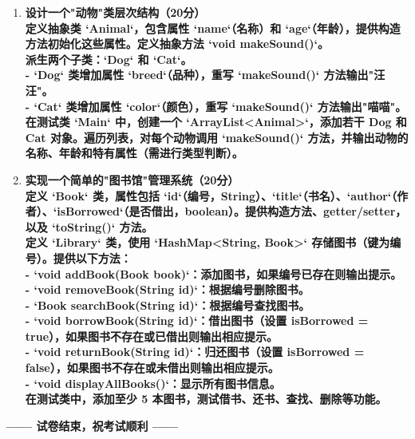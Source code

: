 \documentclass[a3paper, landscape, 11pt, twocolumn]{article}
\begin{document}
\begin{enumerate}[label=\arabic*.]

	\item \textbf{设计一个"动物"类层次结构（20分）\\
	      定义抽象类 `Animal`，包含属性 `name`（名称）和 `age`（年龄），提供构造方法初始化这些属性。定义抽象方法 `void makeSound()`。\\
	      派生两个子类：`Dog` 和 `Cat`。\\
	      - `Dog` 类增加属性 `breed`（品种），重写 `makeSound()` 方法输出"汪汪"。\\
	      - `Cat` 类增加属性 `color`（颜色），重写 `makeSound()` 方法输出"喵喵"。\\
	      在测试类 `Main` 中，创建一个 `ArrayList<Animal>`，添加若干 Dog 和 Cat 对象。遍历列表，对每个动物调用 `makeSound()` 方法，并输出动物的名称、年龄和特有属性（需进行类型判断）。}
	\item \textbf{实现一个简单的"图书馆"管理系统（20分）\\
	      定义 `Book` 类，属性包括 `id`（编号，String）、`title`（书名）、`author`（作者）、`isBorrowed`（是否借出，boolean）。提供构造方法、getter/setter，以及 `toString()` 方法。\\
	      定义 `Library` 类，使用 `HashMap<String, Book>` 存储图书（键为编号）。提供以下方法：\\
	      - `void addBook(Book book)`：添加图书，如果编号已存在则输出提示。\\
	      - `void removeBook(String id)`：根据编号删除图书。\\
	      - `Book searchBook(String id)`：根据编号查找图书。\\
	      - `void borrowBook(String id)`：借出图书（设置 isBorrowed = true），如果图书不存在或已借出则输出相应提示。\\
	      - `void returnBook(String id)`：归还图书（设置 isBorrowed = false），如果图书不存在或未借出则输出相应提示。\\
	      - `void displayAllBooks()`：显示所有图书信息。\\
	      在测试类中，添加至少 5 本图书，测试借书、还书、查找、删除等功能。}
\end{enumerate}

\newpage
\begin{center}
	{\large\bfseries —— 试卷结束，祝考试顺利 ——}
\end{center}
\end{document}
